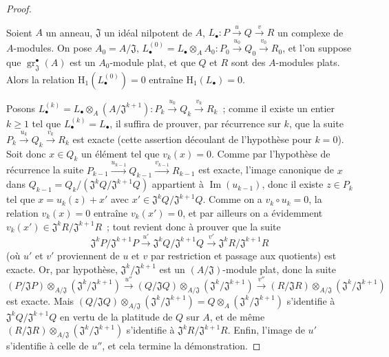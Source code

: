 \begin{proof}
\begin{lemma}[12.3.3.5]
\label{IV.12.3.3.5-fr}
Soient $A$ un anneau, $\mathfrak J$ un idéal nilpotent de $A$,
$L_\bullet:P\xrightarrow{u}Q\xrightarrow{v}R$ un complexe de $A$-modules. On
pose $A_0=A/\mathfrak J$,
$L_\bullet^{(0)}=L_\bullet\otimes_AA_0:
P_0\xrightarrow{u_0}Q_0\xrightarrow{v_0}R_0$, et l'on suppose que
$\operatorname{gr}_{\mathfrak J}^{\bullet}(A)$ est un $A_0$-module plat, et
que $Q$ et $R$ sont des $A$-modules plats. Alors la relation
$\mathrm H_1(L_\bullet^{(0)})=0$ entraîne $\mathrm H_1(L_\bullet)=0$.
\end{lemma}

Posons
$L_\bullet^{(k)}=L_\bullet\otimes_A(A/\mathfrak J^{k+1}):
P_k\xrightarrow{u_k}Q_k\xrightarrow{v_k}R_k$~; comme il existe un entier
$k\geq1$ tel que $L_\bullet^{(k)}=L_\bullet$, il suffira de prouver, par
récurrence sur $k$, que la suite
$P_k\xrightarrow{u_k}Q_k\xrightarrow{v_k}R_k$ est
exacte (cette assertion découlant de l'hypothèse pour $k=0$). Soit donc
$x\in Q_k$ un élément tel que $v_k(x)=0$. Comme par l'hypothèse de récurrence
la suite
$P_{k-1}\xrightarrow{u_{k-1}}Q_{k-1}\xrightarrow{v_{k-1}}R_{k-1}$ est exacte,
l'image canonique de $x$ dans
$Q_{k-1}=Q_k/(\mathfrak J^kQ/\mathfrak J^{k+1}Q)$ appartient à
$\operatorname{Im}(u_{k-1})$, donc il existe $z\in P_k$ tel que
$x=u_k(z)+x'$ avec $x'\in\mathfrak J^kQ/\mathfrak J^{k+1}Q$. Comme on a
$v_k\circ u_k=0$, la relation $v_k(x)=0$ entraîne $v_k(x')=0$, et par ailleurs
on a évidemment $v_k(x')\in\mathfrak J^kR/\mathfrak J^{k+1}R$~; tout revient
donc à prouver que la suite
\[
  \mathfrak J^kP/\mathfrak J^{k+1}P\xrightarrow{u'}
  \mathfrak J^kQ/\mathfrak J^{k+1}Q\xrightarrow{v'}
  \mathfrak J^kR/\mathfrak J^{k+1}R
\]
(où $u'$ et $v'$ proviennent de $u$ et $v$ par restriction et passage aux
quotients) est exacte. Or, par hypothèse,
$\mathfrak J^k/\mathfrak J^{k+1}$ est un $(A/\mathfrak J)$-module plat, donc la
suite
\[
  (P/\mathfrak JP)\otimes_{A/\mathfrak J}
  (\mathfrak J^k/\mathfrak J^{k+1})\xrightarrow{u''}
  (Q/\mathfrak JQ)\otimes_{A/\mathfrak J}
  (\mathfrak J^k/\mathfrak J^{k+1})\xrightarrow{v''}
  (R/\mathfrak JR)\otimes_{A/\mathfrak J}
  (\mathfrak J^k/\mathfrak J^{k+1})
\]
est exacte. Mais
$(Q/\mathfrak JQ)\otimes_{A/\mathfrak J}
(\mathfrak J^k/\mathfrak J^{k+1})
=Q\otimes_A(\mathfrak J^k/\mathfrak J^{k+1})$ s'identifie à
$\mathfrak J^kQ/\mathfrak J^{k+1}Q$ en vertu de la platitude de $Q$ sur $A$,
et de même
$(R/\mathfrak JR)\otimes_{A/\mathfrak J}
(\mathfrak J^k/\mathfrak J^{k+1})$ s'identifie à
$\mathfrak J^kR/\mathfrak J^{k+1}R$. Enfin, l'image de $u'$ s'identifie à
celle de $u''$, et cela termine la démonstration.
\end{proof}

